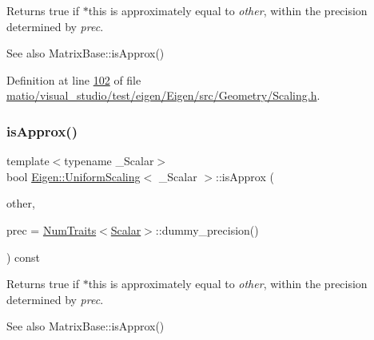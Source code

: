 \begin{DoxyReturn}{Returns}
{\ttfamily true} if {\ttfamily $\ast$this} is approximately equal to {\itshape other}, within the precision determined by {\itshape prec}.
\end{DoxyReturn}
\begin{DoxySeeAlso}{See also}
Matrix\+Base\+::is\+Approx() 
\end{DoxySeeAlso}


Definition at line \hyperlink{matio_2visual__studio_2test_2eigen_2_eigen_2src_2_geometry_2_scaling_8h_source_l00102}{102} of file \hyperlink{matio_2visual__studio_2test_2eigen_2_eigen_2src_2_geometry_2_scaling_8h_source}{matio/visual\+\_\+studio/test/eigen/\+Eigen/src/\+Geometry/\+Scaling.\+h}.

\mbox{\label{class_eigen_1_1_uniform_scaling_a7f736fdbe43f7bce3d277312efdc315e}} 
\subsubsection{\texorpdfstring{is\+Approx()}{isApprox()}\hspace{0.1cm}{\footnotesize\ttfamily [2/2]}}
{\footnotesize\ttfamily template$<$typename \+\_\+\+Scalar$>$ \\
bool \hyperlink{class_eigen_1_1_uniform_scaling}{Eigen\+::\+Uniform\+Scaling}$<$ \+\_\+\+Scalar $>$\+::is\+Approx (\begin{DoxyParamCaption}\item[{const \hyperlink{class_eigen_1_1_uniform_scaling}{Uniform\+Scaling}$<$ \+\_\+\+Scalar $>$ \&}]{other,  }\item[{const typename \hyperlink{group___core___module_struct_eigen_1_1_num_traits}{Num\+Traits}$<$ \hyperlink{class_eigen_1_1_uniform_scaling_a04c4339f58f1210c5d4d34b1bd7ae283}{Scalar} $>$\+::Real \&}]{prec = {\ttfamily \hyperlink{group___core___module_struct_eigen_1_1_num_traits}{Num\+Traits}$<$\hyperlink{class_eigen_1_1_uniform_scaling_a04c4339f58f1210c5d4d34b1bd7ae283}{Scalar}$>$\+:\+:dummy\+\_\+precision()} }\end{DoxyParamCaption}) const\hspace{0.3cm}{\ttfamily [inline]}}

\begin{DoxyReturn}{Returns}
{\ttfamily true} if {\ttfamily $\ast$this} is approximately equal to {\itshape other}, within the precision determined by {\itshape prec}.
\end{DoxyReturn}
\begin{DoxySeeAlso}{See also}
Matrix\+Base\+::is\+Approx() 
\end{DoxySeeAlso}



